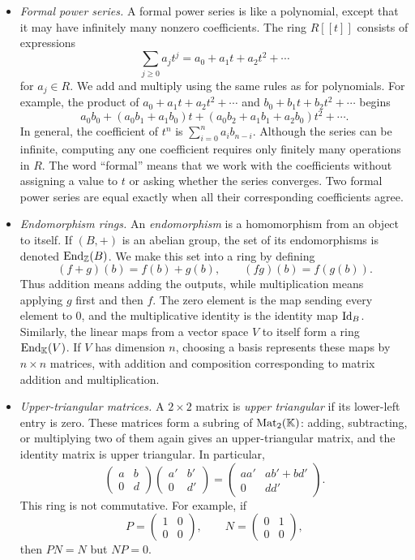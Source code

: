 \documentclass[Notebook.tex]{subfiles}
\begin{document}
\begin{itemize}
	\item \emph{Formal power series.} A formal power series is like a polynomial, except that it may have infinitely many nonzero coefficients. The ring $R[[t]]$ consists of expressions
	\[
	\sum_{j\geq0} a_j t^j = a_0+a_1t+a_2t^2+\cdots
	\]
	for $a_j \in R$. We add and multiply using the same rules as for polynomials. For example, the product of $a_0+a_1t+a_2t^2+\cdots$ and $b_0+b_1t+b_2t^2+\cdots$ begins
	\[
	a_0b_0+(a_0b_1+a_1b_0)t
	+(a_0b_2+a_1b_1+a_2b_0)t^2+\cdots.
	\]
	In general, the coefficient of $t^n$ is $\sum_{i=0}^n a_ib_{n-i}$. Although the series can be infinite, computing any one coefficient requires only finitely many operations in $R$. The word ``formal'' means that we work with the coefficients without assigning a value to $t$ or asking whether the series converges. Two formal power series are equal exactly when all their corresponding coefficients agree.

	\item \emph{Endomorphism rings.} An \emph{endomorphism} is a homomorphism from an object to itself. If $(B,+)$ is an abelian group, the set of its endomorphisms is denoted $\operatorname{End}_{\mathbb Z}(B)$. We make this set into a ring by defining
	\[
	(f+g)(b)=f(b)+g(b),
	\qquad
	(fg)(b)=f(g(b)).
	\]
	Thus addition means adding the outputs, while multiplication means applying $g$ first and then $f$. The zero element is the map sending every element to $0$, and the multiplicative identity is the identity map $\operatorname{Id}_B$. Similarly, the linear maps from a vector space $V$ to itself form a ring $\operatorname{End}_\mathbb K(V)$. If $V$ has dimension $n$, choosing a basis represents these maps by $n\times n$ matrices, with addition and composition corresponding to matrix addition and multiplication.

	\item \emph{Upper-triangular matrices.} A $2\times2$ matrix is \emph{upper triangular} if its lower-left entry is zero. These matrices form a subring of $\operatorname{Mat}_2(\mathbb K)$: adding, subtracting, or multiplying two of them again gives an upper-triangular matrix, and the identity matrix is upper triangular. In particular,
	\[
	\begin{pmatrix}a&b\\0&d\end{pmatrix}
	\begin{pmatrix}a'&b'\\0&d'\end{pmatrix}
	=
	\begin{pmatrix}aa'&ab'+bd'\\0&dd'\end{pmatrix}.
	\]
	This ring is not commutative. For example, if
	\[
	P=\begin{pmatrix}1&0\\0&0\end{pmatrix},
	\qquad
	N=\begin{pmatrix}0&1\\0&0\end{pmatrix},
	\]
	then $PN=N$ but $NP=0$.


\end{itemize}
\end{document}
